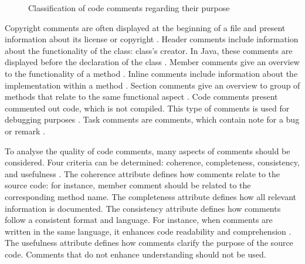 \begin{figure}[H]
\centering
{}
\caption{Classification of code comments regarding their purpose
\cite{hassan2022code}}
\label{fig:comment_classification}
\end{figure}





Copyright comments are often displayed at the beginning of a file and present information about its license or copyright \cite{steidl2013quality}. Header comments include information about the functionality of the class: class's creator. In Java, these comments are displayed before the declaration of the class \cite{hassan2022code}. Member comments give an overview to the functionality of a method \cite{steidl2013quality}. Inline comments include information about the implementation within a method \cite{steidl2013quality}. Section comments give an overview to group of methods that relate to the same functional aspect \cite{hassan2022code}. Code comments present commented out code, which is not compiled. This type of comments is used for debugging purposes \cite{steidl2013quality}. Task comments are comments, which contain note for a bug or remark \cite{steidl2013quality}.



To analyse the quality of code comments, many aspects of comments should be considered. Four criteria can be determined: coherence, completeness, consistency, and usefulness \cite{steidl2013quality}.
The coherence attribute defines how comments relate to the source code: for instance, member comment should be related to the corresponding method name.
The completeness attribute defines how all relevant information is documented. 
The consistency attribute defines how comments follow a consistent format and language. For instance, when comments are written in the same language, it enhances code readability and comprehension \cite{steidl2013quality}.
The usefulness attribute defines how comments clarify the purpose of the source code. Comments that do not enhance understanding should not be used. 


